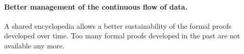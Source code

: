 \paragraph{Better management of the continuous flow of data.}
A shared encyclopedia allows a better sustainability of the formal
proofs developed over time. Too many formal proofs developed in the
past are not available any more.


